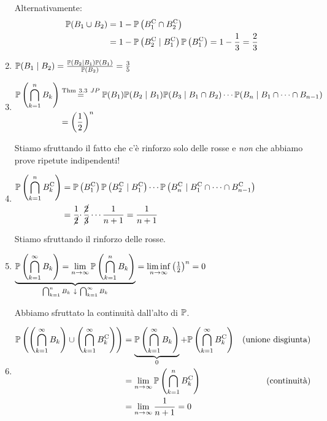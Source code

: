 \begin{enumerate}
Alternativamente:\begin{align*}
\mathbb{P}( B_{1} \cup B_{2}) & =1-\mathbb{P}\left( B_{1}^{\mathrm{C}} \cap B_{2}^{\mathrm{C}}\right)\\
 & =1-\mathbb{P}\left( B_{2}^{\mathrm{C}} \mid B_{1}^{\mathrm{C}}\right)\mathbb{P}\left( B_{1}^{\mathrm{C}}\right) =1-\frac{1}{3} =\frac{2}{3}
\end{align*}
\item $\mathbb{P}( B_{1} \mid B_{2}) =\frac{\mathbb{P}( B_{2} \mid B_{1})\mathbb{P}( B_{1})}{\mathbb{P}( B_{2})} =\frac{3}{5}$
\item $\begin{aligned}
\mathbb{P}\left(\bigcap\limits _{k=1}^{n} B_{k}\right) & \overset{\text{Thm} \ 3.3\ JP}{=}\mathbb{P}( B_{1})\mathbb{P}( B_{2} \mid B_{1})\mathbb{P}( B_{3} \mid B_{1} \cap B_{2}) \cdots \mathbb{P}( B_{n} \mid B_{1} \cap \cdots \cap B_{n-1})\\
 & =\left(\frac{1}{2}\right)^{n}
\end{aligned}$

Stiamo sfruttando il fatto che c'è rinforzo solo delle rosse e \textit{non} che abbiamo prove ripetute indipendenti!
\item $\begin{aligned}
\mathbb{P}\left(\bigcap\limits _{k=1}^{n} B_{k}^{\mathrm{C}}\right) & =\mathbb{P}\left( B_{1}^{\mathrm{C}}\right)\mathbb{P}\left( B_{2}^{\mathrm{C}} \mid B_{1}^{\mathrm{C}}\right) \cdots \mathbb{P}\left( B_{n}^{\mathrm{C}} \mid B_{1}^{\mathrm{C}} \cap \cdots \cap B_{n-1}^{\mathrm{C}}\right)\\
 & =\frac{1}{\cancel{2}} \cdotp \frac{\cancel{2}}{\cancel{3}} \cdots \frac{1}{n+1} =\frac{1}{n+1}
\end{aligned}$

Stiamo sfruttando il rinforzo delle rosse.
\item $\underbrace{\mathbb{P}\left(\bigcap\limits _{k=1}^{\infty } B_{k}\right) =\lim\limits _{n\rightarrow \infty }\mathbb{P}\left(\bigcap\limits _{k=1}^{n} B_{k}\right)}_{\bigcap _{k=1}^{n} B_{k} \ \downarrow \ \bigcap _{k=1}^{\infty } B_{k}} =\liminf\limits _{n\rightarrow \infty }\left(\frac{1}{2}\right)^{n} =0$

Abbiamo sfruttato la continuità dall'alto di $\mathbb{P}$.
\item $\begin{aligned}
\mathbb{P}\left(\left(\bigcap\limits _{k=1}^{\infty } B_{k}\right) \cup \left(\bigcap\limits _{k=1}^{\infty } B_{k}^{\mathrm{C}}\right)\right) & =\underbrace{\mathbb{P}\left(\bigcap\limits _{k=1}^{\infty } B_{k}\right)}_{0} +\mathbb{P}\left(\bigcap\limits _{k=1}^{\infty } B_{k}^{\mathrm{C}}\right) & \text{(unione disgiunta)}\\
 & =\lim\limits _{n\rightarrow \infty }\mathbb{P}\left(\bigcap\limits _{k=1}^{n} B_{k}^{\mathrm{C}}\right) & \text{(continuità)}\\
 & =\lim\limits _{n\rightarrow \infty }\frac{1}{n+1} =0 & 
\end{aligned}$
\end{enumerate}
\Soluzione